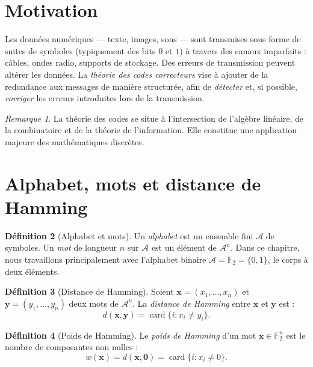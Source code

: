 \documentclass[12pt,a4paper,openany]{book}
\theoremstyle{definition}
\newtheorem{definition}{Définition}[chapter]
\theoremstyle{plain}
\theoremstyle{remark}
\newtheorem{remarque}[definition]{Remarque}
\DeclareMathOperator{\card}{card}
\begin{document}
\section{Motivation}
\label{sec:codes-motivation}

Les données numériques --- texte, images, sons --- sont transmises sous
forme de suites de symboles (typiquement des bits $0$ et $1$) à travers
des canaux imparfaits : câbles, ondes radio, supports de stockage. Des
erreurs de transmission peuvent altérer les données. La \emph{théorie des
codes correcteurs} vise à ajouter de la redondance aux messages de manière
structurée, afin de \emph{détecter} et, si possible, \emph{corriger} les
erreurs introduites lors de la transmission.

\begin{remarque}
La théorie des codes se situe à l'intersection de l'algèbre linéaire,
de la combinatoire et de la théorie de l'information. Elle constitue une
application majeure des mathématiques discrètes.
\end{remarque}

\section{Alphabet, mots et distance de Hamming}
\label{sec:hamming-distance}

\begin{definition}[Alphabet et mots]
\label{def:alphabet}
Un \emph{alphabet} est un ensemble fini $\mathcal{A}$ de symboles. Un
\emph{mot} de longueur $n$ sur $\mathcal{A}$ est un élément de
$\mathcal{A}^n$. Dans ce chapitre, nous travaillons principalement avec
l'alphabet binaire $\mathcal{A} = \mathbb{F}_2 = \{0,1\}$, le corps à
deux éléments.
\end{definition}

\begin{definition}[Distance de Hamming]
\label{def:distance-hamming}
Soient $\mathbf{x} = (x_1, \dots, x_n)$ et
$\mathbf{y} = (y_1, \dots, y_n)$ deux mots de $\mathcal{A}^n$. La
\emph{distance de Hamming} entre $\mathbf{x}$ et $\mathbf{y}$ est :
\[
  d(\mathbf{x}, \mathbf{y}) = \card{\{i : x_i \neq y_i\}}.
\]
\end{definition}

\begin{definition}[Poids de Hamming]
\label{def:poids-hamming}
Le \emph{poids de Hamming} d'un mot $\mathbf{x} \in \mathbb{F}_2^n$ est
le nombre de composantes non nulles :
\[
  w(\mathbf{x}) = d(\mathbf{x}, \mathbf{0}) = \card{\{i : x_i \neq 0\}}.
\]
\end{definition}
\end{document}

